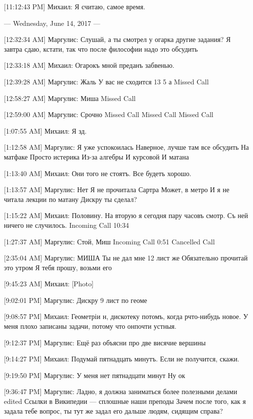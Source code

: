 \documentclass{article}
\newcommand{\yat}{{\fontencoding{X2}\selectfont\cyryat}} %
\begin{document}
[11:12:43 PM] Михаил:
Я считаю, самое время.

--- Wednesday, June 14, 2017 ---

[12:32:34 AM] Маргулис:
Слушай, а ты смотрел у огарка другие задания?
 Я завтра сдаю, кстати, так что после философии надо это обсудить

[12:33:18 AM] Михаил:
Огарокъ мной преданъ забвенью.

[12:39:28 AM] Маргулис:
Жаль
 У вас не сходится 13 5 а
Missed Call

[12:58:27 AM] Маргулис:
Миша
Missed Call

[12:59:00 AM] Маргулис:
Срочно
Missed Call
Missed Call
Missed Call

[1:07:55 AM] Михаил:
Я зд.

[1:12:58 AM] Маргулис:
Я уже успокоилась
 Наверное, лучше там все обсудить
 На матфаке
 Просто истерика
 Из-за алгебры
 И курсовой
 И матана

[1:13:40 AM] Михаил:
Они того не стоятъ.
 Все будетъ хорошо.

[1:13:57 AM] Маргулис:
Нет
 Я не прочитала Сартра
 Может, в метро
 И я не читала лекции по матану
 Дискру ты сделал?

[1:15:22 AM] Михаил:
Половину. На вторую я сегодня пару часовъ смотр. Съ ней ничего не случилось.
Incoming Call 10:34

[1:27:37 AM] Маргулис:
Стой, Миш
Incoming Call 0:51
Cancelled Call

[2:35:04 AM] Маргулис:
МИША
 Ты не дал мне 12 лист же
 Обязательно прочитай это утром
 Я тебя прошу, возьми его

[9:45:23 AM] Михаил:
[Photo]

[9:02:01 PM] Маргулис:
Дискру
 9 лист по геоме

[9:08:57 PM] Михаил:
Геометріи н, дискотеку потомъ, когда р что-нибудь новое. У меня плохо записаны задачи, потому что он\yat почти устныя.

[9:12:37 PM] Маргулис:
Ещё раз объясни про две висячие вершины

[9:14:27 PM] Михаил:
Подумай пятнадцать минутъ. Если не получится, скажи.

[9:19:50 PM] Маргулис:
У меня нет пятнадцати минут
 Ну ок

[9:36:47 PM] Маргулис:
Ладно, я должна заниматься более полезными делами
edited 
Ссылки в Википедии — сплошные наши преподы
 Зачем после того, как я задала тебе вопрос, ты тут же задал его дальше людям, сидящим справа?
\end{document}
